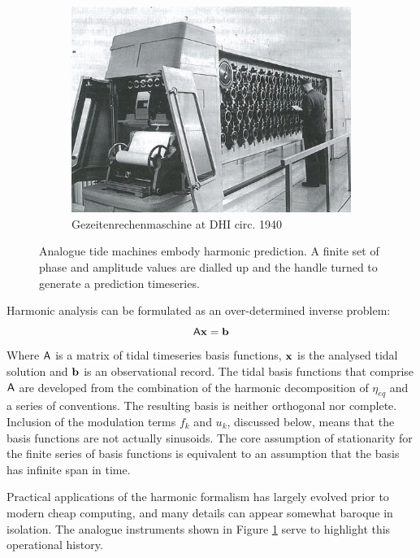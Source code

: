 \begin{figure}[H]
\begin{subfigure}[t]{\figwidthHalf}
    	\includegraphics[width=\textwidth]{figures/images/DHI_machine_cartwright_fig11p2.png}
	    \caption{Gezeitenrechenmaschine at DHI circ. 1940 }
	\end{subfigure}
	\caption{Analogue tide machines embody harmonic prediction.  A finite set of phase and amplitude values are dialled up and the handle turned to generate a prediction timeseries.}
	\label{fig:tide_machines}
\end{figure}
Harmonic analysis can be formulated as an over-determined inverse problem:
\begin{equation}
    \label{E:Axb}   
    \mathsf{A} \mathbf{x}=\mathbf{b} 
\end{equation}
Where $\mathsf{A}$ is a matrix of tidal timeseries basis functions, $\mathbf{x}$ is the analysed tidal solution and $\mathbf{b}$ is an observational record. The tidal basis functions that comprise $\mathsf{A}$ are developed from the combination of the harmonic decomposition of $\eta_{eq}$ and a series of conventions.  The resulting basis is neither orthogonal nor complete. Inclusion of the modulation terms $f_k$ and $u_k$, discussed below, means that the basis functions are not actually sinusoids. The core assumption of stationarity for the finite series of basis functions is equivalent to an assumption that the basis has infinite span in time.   

Practical applications of the harmonic formalism has largely evolved prior to modern cheap computing, and many details can appear somewhat baroque in isolation.  The analogue instruments shown in Figure \ref{fig:tide_machines} serve to highlight this operational history.


